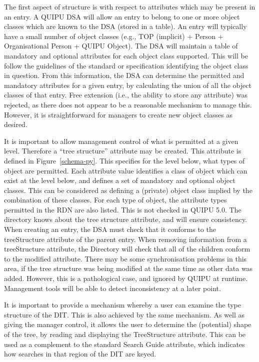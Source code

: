 The first aspect of structure is with respect to attributes which may be
present in an entry.  A QUIPU DSA will allow an entry to belong to one or
more object classes which are known to the DSA (stored in a table).  An
entry will typically have a small number of object classes (e.g., TOP
(implicit) + Person + Organisational Person + QUIPU Object).  The DSA will
maintain a table of mandatory and optional attributes for each object class
supported.  This will be follow the guidelines of the standard or
specification identifying the object class in question.  From this
information, the DSA can determine the permitted and mandatory attributes for a
given entry, by calculating the union of all the object classes of that
entry.  Free extension (i.e., the ability to store any attribute) was
rejected, as there does not appear to be a reasonable mechanism to manage
this.  However, it is straightforward for managers to create new object
classes as desired.

It is important 
to allow management control of what is permitted at a given level.
Therefore a ``tree structure''
attribute may be created.  
This attribute is defined in Figure~\ref{schema-py}.
This specifies for the level below,
what types of object are permitted.  
Each attribute value identifies a class of object which can exist at the level
below, and 
defines a set of mandatory and optional object classes.
This can be considered as defining a (private) object class implied by the
combination of these classes.
For each type of object, the attribute types permitted in the RDN are also
listed.  This is not checked in QUIPU 5.0.
The directory knows about the tree structure attribute, and will
ensure consistency.  
When creating an entry, the DSA must check that it conforms to the
treeStructure attribute of the parent entry.
When removing information from a treeStructure attribute, the
Directory will  check that all of the children conform to the
modified attribute.
There may be some synchronisation problems in this area, if the tree
structure was being modified at the same time as other data was added.
However, this is a pathological case, and ignored by QUIPU at runtime.
Management tools will be able to detect inconsistency at a later point.




It is important to provide a mechanism whereby a user can examine the
type structure of the  DIT.
This is also achieved by the same mechanism.
As well as giving the manager control, it allows the user to
determine the (potential) shape of the tree, by reading and
displaying the TreeStructure attribute.
This can be used as a complement to the standard Search Guide attribute, 
which indicates how searches in that region of the DIT are keyed.

